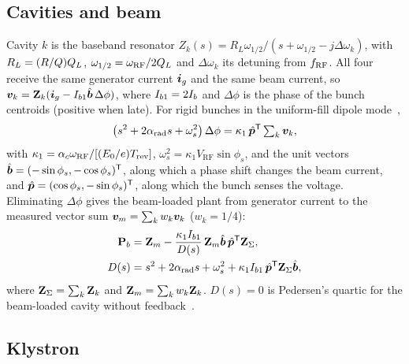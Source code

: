 \subsection{Cavities and beam}

Cavity $k$ is the baseband resonator $Z_k(s)=R_L\omega_{1/2}/(s+\omega_{1/2}-j\Delta\omega_k)$, with $R_L=(R/Q)Q_L$, $\omega_{1/2}=\omega_\mathrm{RF}/2Q_L$ and $\Delta\omega_k$ its detuning from $f_\mathrm{RF}$. All four receive the same generator current $\bm{i}_g$ and the same beam current, so $\bm{v}_k=\mathbf{Z}_k(\bm{i}_g-I_{b1}\hat{\bm{b}}\,\Delta\phi)$, where $I_{b1}=2I_b$ and $\Delta\phi$ is the phase of the bunch centroids (positive when late). For rigid bunches in the uniform-fill dipole mode~\cite{Pedersen1975,Chao1993},
\begin{equation}\label{eq:beam}
\left(s^2+2\alpha_\mathrm{rad} s+\omega_s^2\right)\Delta\phi=\kappa_1\,\hat{\bm{p}}^\mathsf{T}\textstyle\sum_k\bm{v}_k,
\end{equation}
with $\kappa_1=\alpha_c\omega_\mathrm{RF}/[(E_0/e)T_\mathrm{rev}]$, $\omega_s^2=\kappa_1V_\mathrm{RF}\sin\phi_s$, and the unit vectors $\hat{\bm{b}}=(-\sin\phi_s,-\cos\phi_s)^\mathsf{T}$, along which a phase shift changes the beam current, and $\hat{\bm{p}}=(\cos\phi_s,-\sin\phi_s)^\mathsf{T}$, along which the bunch senses the voltage. Eliminating $\Delta\phi$ gives the beam-loaded plant from generator current to the measured vector sum $\bm{v}_m=\sum_kw_k\bm{v}_k$ ($w_k=1/4$):
\begin{align}
\mathbf{P}_b&=\mathbf{Z}_m-\frac{\kappa_1I_{b1}}{D(s)}\,\mathbf{Z}_m\hat{\bm{b}}\,\hat{\bm{p}}^\mathsf{T}\mathbf{Z}_\Sigma,\label{eq:plant}\\
D(s)&=s^2+2\alpha_\mathrm{rad} s+\omega_s^2+\kappa_1I_{b1}\,\hat{\bm{p}}^\mathsf{T}\mathbf{Z}_\Sigma\hat{\bm{b}},\label{eq:Dopen}
\end{align}
where $\mathbf{Z}_\Sigma=\sum_k\mathbf{Z}_k$ and $\mathbf{Z}_m=\sum_kw_k\mathbf{Z}_k$. $D(s)=0$ is Pedersen's quartic for the beam-loaded cavity without feedback~\cite{Pedersen1975}.

\subsection{Klystron}

